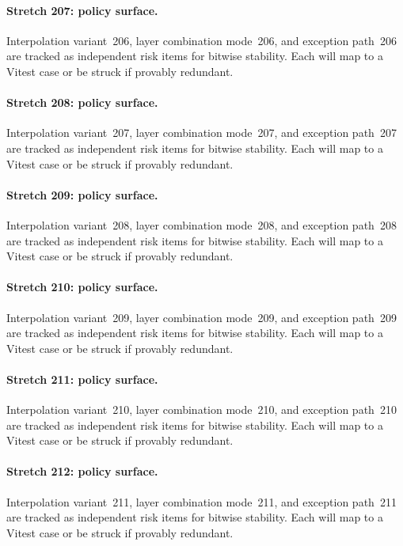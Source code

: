 \documentclass[sigconf,nonacm]{acmart}
\begin{document}
\paragraph{Stretch 207: policy surface.}
Interpolation variant~206, layer combination mode~206, and exception path~206 are tracked as independent risk items for bitwise stability. Each will map to a Vitest case or be struck if provably redundant. %

\paragraph{Stretch 208: policy surface.}
Interpolation variant~207, layer combination mode~207, and exception path~207 are tracked as independent risk items for bitwise stability. Each will map to a Vitest case or be struck if provably redundant. %

\paragraph{Stretch 209: policy surface.}
Interpolation variant~208, layer combination mode~208, and exception path~208 are tracked as independent risk items for bitwise stability. Each will map to a Vitest case or be struck if provably redundant. %

\paragraph{Stretch 210: policy surface.}
Interpolation variant~209, layer combination mode~209, and exception path~209 are tracked as independent risk items for bitwise stability. Each will map to a Vitest case or be struck if provably redundant. %

\paragraph{Stretch 211: policy surface.}
Interpolation variant~210, layer combination mode~210, and exception path~210 are tracked as independent risk items for bitwise stability. Each will map to a Vitest case or be struck if provably redundant. %

\paragraph{Stretch 212: policy surface.}
Interpolation variant~211, layer combination mode~211, and exception path~211 are tracked as independent risk items for bitwise stability. Each will map to a Vitest case or be struck if provably redundant. %
\end{document}
